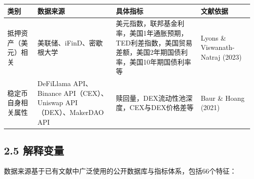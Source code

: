 \documentclass[
  letterpaper,
  DIV=11,
  numbers=noendperiod]{scrartcl}
\begin{document}
\begin{longtable}[]{@{}
  >{\raggedright\arraybackslash}p{}
  >{\raggedright\arraybackslash}p{}
  >{\raggedright\arraybackslash}p{}
  >{\raggedright\arraybackslash}p{}@{}}
\toprule\noalign{}
\begin{minipage}[b]{\linewidth}\raggedright
类别
\end{minipage} & \begin{minipage}[b]{\linewidth}\raggedright
数据来源
\end{minipage} & \begin{minipage}[b]{\linewidth}\raggedright
具体指标
\end{minipage} & \begin{minipage}[b]{\linewidth}\raggedright
文献依据
\end{minipage} \\
\midrule\noalign{}
\endhead
\bottomrule\noalign{}
\endlastfoot
抵押资产（美元）相关 & 美联储、iFinD、密歇根大学 &
美元指数，联邦基金利率，美国1年通胀预期，TED利差指数，美国贸易差额，美国2年期国债利率，美国10年期国债利率等
& Lyons \& Viswanath-Natraj (2023) \\
稳定币自身相关属性 & DeFiLlama API、Binance API（CEX）、Uniswap
API（DEX）、MakerDAO API & 赎回量，DEX流动性池深度，CEX与DEX价格差等 &
Baur \& Hoang (2021) \\
\end{longtable}

\subsection{2.5 解释变量}\label{ux89e3ux91caux53d8ux91cf-1}

数据来源基于已有文献中广泛使用的公开数据库与指标体系，包括66个特征：
\end{document}
